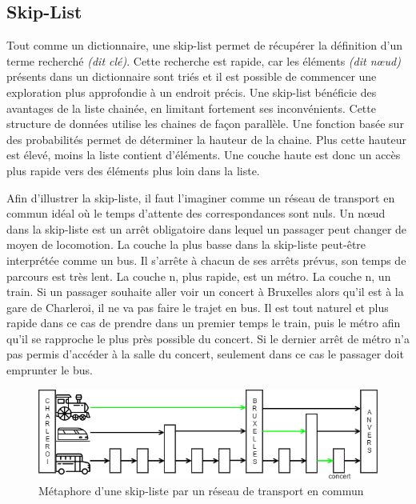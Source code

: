 \documentclass[hidelinks,a4paper, 12pt]{article}
\begin{document}
	\newpage
	\subsection{Skip-List}
	
	
	Tout comme un dictionnaire, une skip-list permet de récupérer la définition d'un terme recherché \textit{(dit clé)}. Cette recherche est rapide, car les éléments \textit{(dit nœud)} présents dans un dictionnaire sont triés et il est possible de commencer une exploration plus approfondie à un endroit précis.
	Une skip-list bénéficie des avantages de la liste chainée, en limitant fortement ses inconvénients. Cette structure de données utilise les chaines de façon parallèle. Une fonction basée sur des probabilités permet de déterminer la hauteur de la chaine. Plus cette hauteur est élevé, moins la liste contient d'éléments. Une couche haute est donc un accès plus rapide vers des éléments plus loin dans la liste.
	
	
	
	Afin d'illustrer la skip-liste, il faut l'imaginer comme un réseau de transport en commun idéal où le temps d'attente des correspondances sont nuls. Un nœud dans la skip-liste est un arrêt obligatoire dans lequel un passager peut changer de moyen de locomotion. La couche la plus basse dans la skip-liste peut-être interprétée comme un bus. Il s'arrête à chacun de ses arrêts prévus, son temps de parcours est très lent. La couche n, plus rapide, est un métro. La couche n, un train. Si un passager souhaite aller voir un concert à Bruxelles alors qu'il est à la gare de Charleroi, il ne va pas faire le trajet en bus. Il est tout naturel et plus rapide dans ce cas de prendre dans un premier temps le train, puis le métro afin qu'il se rapproche le plus près possible du concert. Si le dernier arrêt de métro n'a pas permis d'accéder à la salle du concert, seulement dans ce cas le passager doit emprunter le bus.
	
	\begin{figure}[h!]
		\includegraphics[width=\textwidth]{img/metaphore}
		\caption{Métaphore d'une skip-liste par un réseau de transport en commun}
		\label{skip-meta}
	\end{figure}
	
\end{document}
